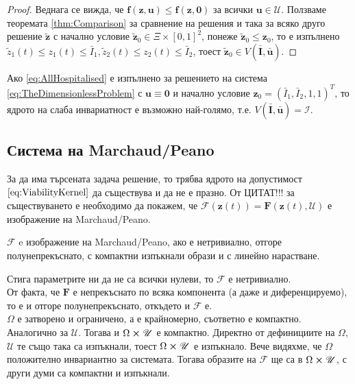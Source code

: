 \begin{proof}
  Веднага се вижда, че $\mathbf{f}(\mathbf{z}, \mathbf{u}) \leq \mathbf{f}(\mathbf{z}, \mathbf{0})$ за всички $\mathbf{u} \in \mathscr{U}$.
  Ползваме теоремата \ref{thm:Comparison} за сравнение на решения и така за всяко друго решение $\tilde{\mathbf{z}}$ с начално условие $\tilde{\mathbf{z}}_0 \in \Xi \times [0, 1]^2$, понеже $\tilde{\mathbf{z}}_0 \leq \mathbf{z}_0$, то е изпълнено $\tilde{z}_1(t) \leq z_1(t) \leq \bar{I}_1, \tilde{z}_2(t) \leq z_2(t) \leq \bar{I}_2$, тоест $\tilde{\mathbf{z}}_0 \in V(\bar{\mathbf{I}}, \bar{\mathbf{u}})$.
\end{proof}

\begin{corollary}
  Ако \ref{eq:AllHospitalised} е изпълнено за решението на система \ref{eq:TheDimensionlessProblem} с $\mathbf{u} \equiv \mathbf{0}$ и начално условие $\mathbf{z}_0 = (\bar{I}_1, \bar{I}_2, 1, 1)^T$, то ядрото на слаба инвариатност е възможно най-голямо, т.е. $V(\bar{\mathbf{I}}, \bar{\mathbf{u}}) = \mathscr{I}$.
\end{corollary}

\subsection{Система на Marchaud/Peano}
За да има търсената задача решение, то трябва ядрото на допустимост $\eqref{eq:ViabilityKernel}$ да съществува и да не е празно. От \color{Red} ЦИТАТ!!!
\color{Black} за съществуването е необходимо да покажем, че $\mathscr{F}(\mathbf{z}(t))=\mathbf{F}(\mathbf{z}(t), \mathscr{U})$ е изображение на Marchaud/Peano.

$\mathscr{F}$ e изображение на Marchaud/Peano, ако е нетривиално, отгоре полунепрекъснато, с компактни изпъкнали образи и с линейно нарастване.

Стига параметрите ни да не са всички нулеви, то $\mathscr{F}$ е нетривиално. \\
От факта, че $\mathbf{F}$ е непрекъснато по всяка компонента (а даже и диференцируемо), то е и отгоре полунепрекъснато, откъдето и $\mathscr{F}$ е. \\
$\Omega$ е затворено и ограничено, а е крайномерно, съответно е компактно. Аналогично за $\mathscr{U}$. Тогава и $\Omega \cross \mathscr{U}$ е компактно. Директно от дефинициите на $\Omega$, $\mathscr{U}$ те също така са изпъкнали, тоест $\Omega \cross \mathscr{U}$ е изпъкнало. Вече видяхме, че $\Omega$ положително инвариантно за системата. Тогава образите на $\mathscr{F}$ ще са в $\Omega \cross \mathscr{U}$, с други думи са компактни и изпъкнали. \\


